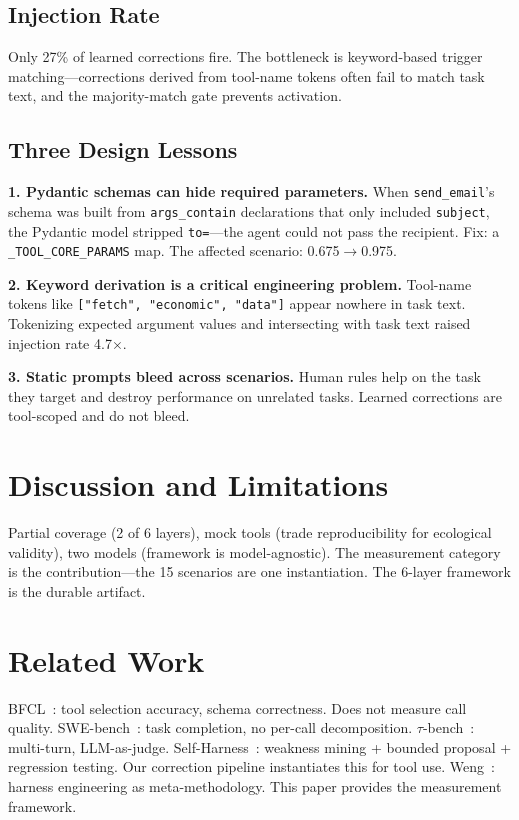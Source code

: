 \documentclass[11pt]{article}
\begin{document}
\subsection{Injection Rate}

Only 27\% of learned corrections fire. The bottleneck is keyword-based trigger
matching---corrections derived from tool-name tokens often fail to match task
text, and the majority-match gate prevents activation.

\subsection{Three Design Lessons}

\textbf{1. Pydantic schemas can hide required parameters.} When
\texttt{send\_email}'s schema was built from \texttt{args\_contain} declarations
that only included \texttt{subject}, the Pydantic model stripped
\texttt{to=}---the agent could not pass the recipient. Fix: a
\texttt{\_TOOL\_CORE\_PARAMS} map. The affected scenario: 0.675$\rightarrow$0.975.

\textbf{2. Keyword derivation is a critical engineering problem.} Tool-name
tokens like \texttt{["fetch", "economic", "data"]} appear nowhere in task text.
Tokenizing expected argument values and intersecting with task text raised
injection rate 4.7$\times$.

\textbf{3. Static prompts bleed across scenarios.} Human rules help on the
task they target and destroy performance on unrelated tasks. Learned
corrections are tool-scoped and do not bleed.

\section{Discussion and Limitations}

Partial coverage (2 of 6 layers), mock tools (trade reproducibility for
ecological validity), two models (framework is model-agnostic). The
measurement category is the contribution---the 15 scenarios are one
instantiation. The 6-layer framework is the durable artifact.

\section{Related Work}

BFCL~\cite{bfcl}: tool selection accuracy, schema correctness. Does not
measure call quality. SWE-bench~\cite{swebench}: task completion, no per-call
decomposition. $\tau$-bench~\cite{taubench}: multi-turn, LLM-as-judge.
Self-Harness~\cite{selfharness}: weakness mining + bounded proposal +
regression testing. Our correction pipeline instantiates this for tool use.
Weng~\cite{weng2026harness}: harness engineering as meta-methodology. This
paper provides the measurement framework.
\end{document}
